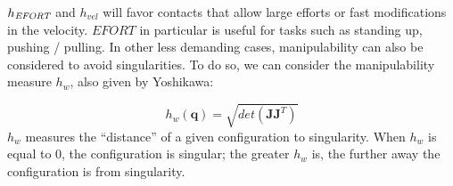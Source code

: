 $h_{\textrm{\it EFORT}}$ and $h_{vel}$ will favor contacts that allow large efforts or fast modifications in the velocity.
$EFORT$ in particular is useful for tasks such as standing up, pushing / pulling.
In other less demanding cases, manipulability can also be considered to avoid singularities.
To do so, we can consider the manipulability measure $h_{w}$, also given by Yoshikawa:

\begin{equation} \label{ellipsoid}
h_{w}(\mathbf{q}) = \sqrt{det(\mathbf{J}\mathbf{J}^T)}
\end{equation}
$h_{w}$ measures the ``distance'' of a given configuration to singularity. When $h_{w}$ is equal to 0, the configuration is singular;
the greater $h_{w}$ is, the further away the configuration is from singularity.



